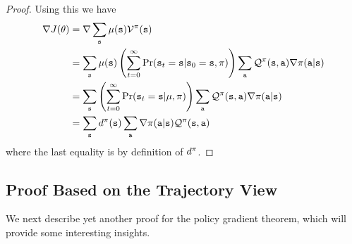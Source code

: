 \begin{proof}
Using this we have
\begin{align*}
\nabla J(\theta) &= \nabla \sum_{{\tt s}} \mu({\tt s}) \mathcal{V}^\pi ({\tt s})\\
&= \sum_{\tt s} \mu({\tt s}) \left(\sum_{t=0}^\infty \Pr({\tt s}_t = {\tt s} | {\tt s}_0 = {\tt s}, \pi) \right) \sum_{\tt a} \mathcal{Q}^\pi ({\tt s},{\tt a}) \nabla\pi({\tt a}|{\tt s}) \\
&= \sum_{\tt s} \left(\sum_{t=0}^\infty \Pr({\tt s}_t = {\tt s} | \mu, \pi) \right) \sum_{\tt a} \mathcal{Q}^\pi ({\tt s},{\tt a}) \nabla\pi({\tt a}|{\tt s}) \\
&= \sum_{\tt s} d^{\pi}({\tt s}) \sum_{\tt a} \nabla\pi({\tt a}|{\tt s}) \mathcal{Q}^\pi ({\tt s},{\tt a}) \\
\end{align*}
where the last equality is by definition of $d^{\pi}$.
\end{proof}


\subsection{Proof Based on the Trajectory View}

We next describe yet another proof for the policy gradient theorem, which will provide some interesting insights.

